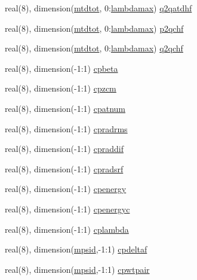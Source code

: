 \begin{DoxyCompactItemize}
\item 
real(8), dimension(\hyperlink{namespacelinresponse_a6bf64170d4100fc94f7b85375e147082}{mtdtot}, 0\+:\hyperlink{namespacelinresponse_a799a3287dd27fc3b00e5f050ed9c95df}{lambdamax}) \hyperlink{namespacelinresponse_a5661ced2c24fb8ad7f99ef6949fb8fe0}{q2qatdhf}
\item 
real(8), dimension(\hyperlink{namespacelinresponse_a6bf64170d4100fc94f7b85375e147082}{mtdtot}, 0\+:\hyperlink{namespacelinresponse_a799a3287dd27fc3b00e5f050ed9c95df}{lambdamax}) \hyperlink{namespacelinresponse_a43b732836eeb8fd0701a1d4d1c84bcf1}{p2qchf}
\item 
real(8), dimension(\hyperlink{namespacelinresponse_a6bf64170d4100fc94f7b85375e147082}{mtdtot}, 0\+:\hyperlink{namespacelinresponse_a799a3287dd27fc3b00e5f050ed9c95df}{lambdamax}) \hyperlink{namespacelinresponse_ae848883da04b775a0c09b1b8b63ac0b2}{q2qchf}
\item 
real(8), dimension(-\/1\+:1) \hyperlink{namespacelinresponse_ab0af48119842ca22b14c5bd0fc696009}{cpbeta}
\item 
real(8), dimension(-\/1\+:1) \hyperlink{namespacelinresponse_a1ac93ef7fd704c651120d666cf06c16d}{cpzcm}
\item 
real(8), dimension(-\/1\+:1) \hyperlink{namespacelinresponse_a8f352b36f61a65b218a2e68b846e45c0}{cpatnum}
\item 
real(8), dimension(-\/1\+:1) \hyperlink{namespacelinresponse_a23b5f09aecbf28425e742b0306bda253}{cpradrms}
\item 
real(8), dimension(-\/1\+:1) \hyperlink{namespacelinresponse_a8d17637a2fa968976fd5d33dd58ca008}{cpraddif}
\item 
real(8), dimension(-\/1\+:1) \hyperlink{namespacelinresponse_afd1f3a534c58c755902559f0379b7dcd}{cpradsrf}
\item 
real(8), dimension(-\/1\+:1) \hyperlink{namespacelinresponse_aedf1f63c865a5ca60d62e01490ff724d}{cpenergy}
\item 
real(8), dimension(-\/1\+:1) \hyperlink{namespacelinresponse_a077f9f139d2e09d605c8abca5faf60f1}{cpenergyc}
\item 
real(8), dimension(-\/1\+:1) \hyperlink{namespacelinresponse_a7af204e35af6978c1c90366dab7d3ea3}{cplambda}
\item 
real(8), dimension(\hyperlink{namespacelinresponse_a7d139c0bde0ee62d24b2906275e8953a}{mpsid},-\/1\+:1) \hyperlink{namespacelinresponse_ad4b3bc883634141ca4d1fc2553bf3182}{cpdeltaf}
\item 
real(8), dimension(\hyperlink{namespacelinresponse_a7d139c0bde0ee62d24b2906275e8953a}{mpsid},-\/1\+:1) \hyperlink{namespacelinresponse_a3b5067bbf38f7b8e3a74eeeea5464a3d}{cpwtpair}

\end{DoxyCompactItemize}

